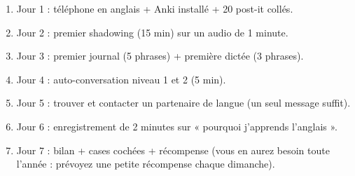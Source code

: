 \begin{mission}
\begin{enumerate}
  \item Jour 1 : téléphone en anglais + Anki installé + 20 post-it collés.
  \item Jour 2 : premier shadowing (15 min) sur un audio de 1 minute.
  \item Jour 3 : premier journal (5 phrases) + première dictée (3 phrases).
  \item Jour 4 : auto-conversation niveau 1 et 2 (5 min).
  \item Jour 5 : trouver et contacter un partenaire de langue (un seul message suffit).
  \item Jour 6 : enregistrement de 2 minutes sur « pourquoi j'apprends l'anglais ».
  \item Jour 7 : bilan + cases cochées + récompense (vous en aurez besoin toute l'année :
  prévoyez une petite récompense chaque dimanche).
\end{enumerate}
\end{mission}
